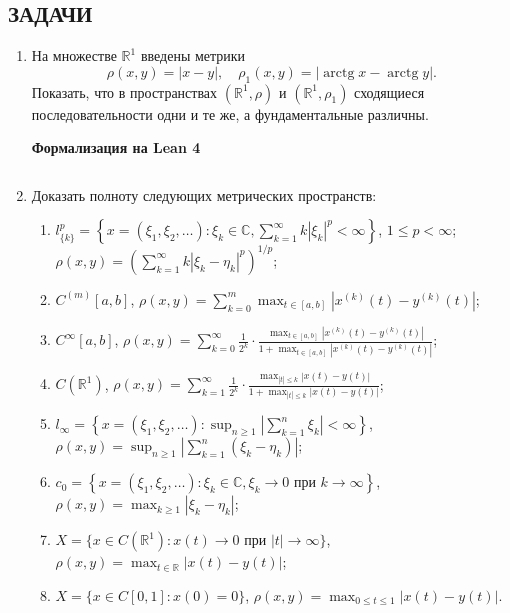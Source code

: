 \documentclass[12pt,a4paper]{article}
\begin{document}
\subsection*{ЗАДАЧИ}
\begin{enumerate}
\newpage
\item На множестве $\mathbb{R}^{1}$ введены метрики
$$\rho(x, y) = |x - y|, \quad \rho_{1}(x, y) = |\operatorname{arctg} x - \operatorname{arctg} y|.$$
Показать, что в пространствах $(\mathbb{R}^{1}, \rho)$ и $(\mathbb{R}^{1}, \rho_{1})$ сходящиеся последовательности одни и те же, а фундаментальные различны.


\begin{center}\small\textbf{Формализация на Lean 4}\end{center}
\inputminted{lean}{FunAn/Section08_CompleteMetric/Task01.lean}

\newpage

\item Доказать полноту следующих метрических пространств:
\begin{enumerate}[label=\alph*)]
\item $l_{\{k\}}^{p} = \left\{x = (\xi_{1}, \xi_{2}, \dots) : \xi_{k} \in \mathbb{C}, \sum_{k=1}^{\infty} k|\xi_{k}|^{p} < \infty\right\}$, $1 \le p < \infty$; \\
$\rho(x, y) = \left( \sum_{k=1}^{\infty} k|\xi_{k} - \eta_{k}|^{p} \right)^{1/p}$;
\item $C^{(m)}[a, b]$, $\rho(x, y) = \sum_{k=0}^{m} \max_{t\in[a, b]} |x^{(k)}(t) - y^{(k)}(t)|$;
\item $C^{\infty}[a, b]$, $\rho(x, y) = \sum_{k=0}^{\infty} \frac{1}{2^{k}} \cdot \frac{\max_{t\in[a, b]} |x^{(k)}(t) - y^{(k)}(t)|}{1 + \max_{t\in[a, b]} |x^{(k)}(t) - y^{(k)}(t)|}$;
\item $C(\mathbb{R}^{1})$, $\rho(x, y) = \sum_{k=1}^{\infty} \frac{1}{2^{k}} \cdot \frac{\max_{|t|\le k} |x(t) - y(t)|}{1 + \max_{|t|\le k} |x(t) - y(t)|}$;
\item $l_{\infty} = \left\{x = (\xi_{1}, \xi_{2}, \dots) : \sup_{n\ge1} \left| \sum_{k=1}^{n} \xi_{k} \right| < \infty \right\}$, \\ $\rho(x, y) = \sup_{n\ge1} \left| \sum_{k=1}^{n} (\xi_{k} - \eta_{k}) \right|$;
\item $c_{0} = \left\{x = (\xi_{1}, \xi_{2}, \dots) : \xi_{k} \in \mathbb{C}, \xi_{k} \rightarrow 0 \text{ при } k \rightarrow \infty\right\}$, \\ $\rho(x, y) = \max_{k\ge1} |\xi_{k} - \eta_{k}|$;
\item $X = \{x \in C(\mathbb{R}^{1}) : x(t) \rightarrow 0 \text{ при } |t| \rightarrow \infty\}$, \\ $\rho(x, y) = \max_{t\in\mathbb{R}} |x(t) - y(t)|$;
\item $X = \{x \in C[0, 1] : x(0) = 0\}$, $\rho(x, y) = \max_{0\le t\le1} |x(t) - y(t)|$.
\end{enumerate}



\end{enumerate}
\end{document}
